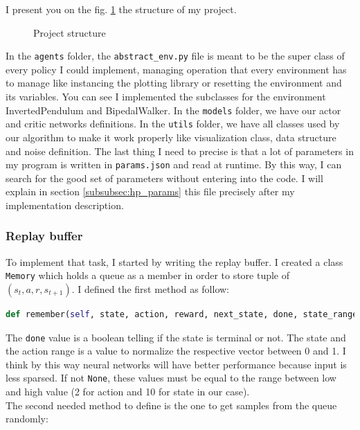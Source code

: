 \documentclass{article}
\begin{document}
I present you on the fig. \ref{fig:structure} the structure of my project.

\begin{figure}[ht]
\caption{Project structure}
\label{fig:structure}
\end{figure}

In the \verb?agents? folder, the \verb?abstract_env.py? file is meant to be the
super class of every policy I could implement, managing operation that every
environment has to manage like instancing the plotting library or resetting the
environment and its variables. You can see I implemented the subclasses for the
environment InvertedPendulum and BipedalWalker. In the \verb?models? folder, we
have our actor and critic networks definitions. In the \verb?utils? folder, we
have all classes used by our algorithm to make it work properly like
visualization class, data structure and noise definition. The last thing I need
to precise is that a lot of parameters in my program is written in
\verb?params.json? and read at runtime. By this way, I can search for the good
set of parameters without entering into the code. I will explain in section
\ref{subsubsec:hp_params} this file precisely after my implementation description.

\subsubsection{Replay buffer}

To implement that task, I started by writing the replay buffer. I created a
class \verb?Memory? which holds a queue as a member in order to store tuple of
$(s_t, a, r, s_{t+1})$. I defined the first method as follow:

\begin{lstlisting}[language=Python]
def remember(self, state, action, reward, next_state, done, state_range=None, action_range=None)
\end{lstlisting}

The \verb?done? value is a boolean telling if the state is terminal or not. The
state and the action range is a value to normalize the respective vector between
0 and 1. I think by this way neural networks will have better performance
because input is less sparsed. If not \verb?None?, these values must be equal to
the range between low and high value (2 for action and 10 for state in our
case).\\
The second needed method to define is the one to get samples from the queue randomly:
\end{document}
